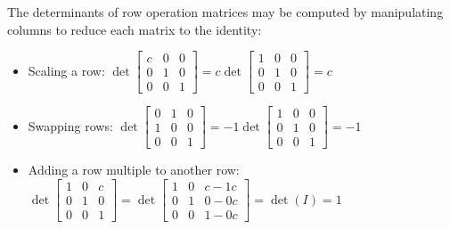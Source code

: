 \begin{fact}
The determinants of row operation matrices may be computed
by manipulating columns to reduce each matrix to the identity:
\begin{itemize}
\item Scaling a row: \(\det
  \begin{bmatrix}
  c & 0 & 0 \\
  0 & 1 & 0 \\
  0 & 0 & 1
  \end{bmatrix}
    =
  c\det
  \begin{bmatrix}
  1 & 0 & 0 \\
  0 & 1 & 0 \\
  0 & 0 & 1
  \end{bmatrix}
    =
  c
\)
\item Swapping rows: \(\det
  \begin{bmatrix}
  0 & 1 & 0 \\
  1 & 0 & 0 \\
  0 & 0 & 1
  \end{bmatrix}
    =
  -1\det
  \begin{bmatrix}
  1 & 0 & 0 \\
  0 & 1 & 0 \\
  0 & 0 & 1
  \end{bmatrix}
    =
  -1
\)
\item Adding a row multiple to another row: \(\det
  \begin{bmatrix}
  1 & 0 & c \\
  0 & 1 & 0 \\
  0 & 0 & 1
  \end{bmatrix}
    =
  \det
  \begin{bmatrix}
  1 & 0 & c-1c \\
  0 & 1 & 0-0c \\
  0 & 0 & 1-0c
  \end{bmatrix}
    =
  \det(I)=1
\)
\end{itemize}
\end{fact}

